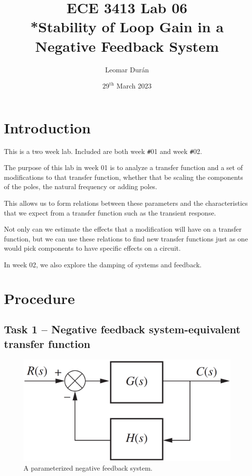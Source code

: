 \documentclass[12pt]{article}
\title{ECE 3413 Lab 06\\*Stability of Loop Gain in a Negative Feedback System}
\author{Leomar Dur\'an}
\date{${29}^{\text{th}}$ March 2023}
\begin{document}
\maketitle
\newpage

\section{Introduction}

This is a two week lab.
Included are both week \texttt\#01 and week \texttt\#02.

The purpose of this lab in week 01 is to analyze a transfer function
and a set of modifications to that transfer function,
whether that be scaling the components of the poles, the natural frequency or adding poles.

This allows us to form relations between these parameters and the characteristics that we expect from a transfer function such as the transient response.

Not only can we estimate the effects that a modification will have on a transfer function, but we can use these relations to find new transfer functions just as one would pick components to have specific effects on a circuit.

In week 02, we also explore the damping of systems and feedback.

\section{Procedure}\label{sec:procedure}

\subsection{Task 1 -- Negative feedback system-equivalent transfer function}\label{ssc:negative feedback equivalent}

\begin{figure}
    \centering
    \includegraphics[width=.8\linewidth]{img/lab06-0000-negative_feedback_system.png}
    \caption{A parameterized negative feedback system.}
    \label{fig:negative feed back system}
\end{figure}
\end{document}
